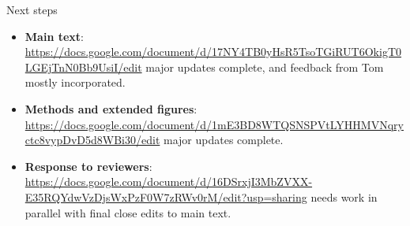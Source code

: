 \documentclass[9pt,aspectratio=169]{beamer}
\begin{document}
\begin{frame}{Next steps}
	\begin{itemize}
		
	\item \textbf{Main text}: \url{https://docs.google.com/document/d/17NY4TB0yHsR5TsoTGiRUT6OkigT0LGEjTnN0Bb9UsiI/edit} major updates complete, and feedback from Tom mostly incorporated. 
	\item \textbf{Methods and extended figures}: \url{https://docs.google.com/document/d/1mE3BD8WTQSNSPVtLYHHMVNqryctc8vypDvD5d8WBi30/edit} major updates complete. 
	\item \textbf{Response to reviewers}: \url{https://docs.google.com/document/d/16DSrxjI3MbZVXX-E35RQYdwVzDjsWxPzF0W7zRWv0rM/edit?usp=sharing} needs work in parallel with final close edits to main text. 
	
	\end{itemize}

\end{frame}
\end{document}
